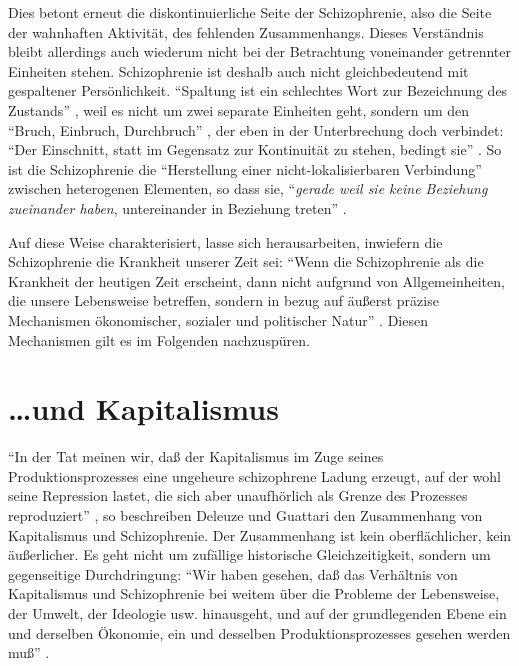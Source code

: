 \documentclass[12pt,
               paper=a4,
               twoside=false,
               onehalfspacing,
               bibliography=totoc,
               toc=graduated,
               ]{scrartcl}
\newcommand{\pc}[2]{\parencite[#1]{#2}}
\begin{document}
Dies betont erneut die diskontinuierliche Seite der Schizophrenie,
also die Seite der wahnhaften Aktivität, des fehlenden Zusammenhangs.
Dieses Verständnis bleibt allerdings auch wiederum nicht bei der
Betrachtung voneinander getrennter Einheiten stehen. Schizophrenie ist
deshalb auch nicht gleichbedeutend mit gespaltener Persönlichkeit.
"`Spaltung ist ein schlechtes Wort zur Bezeichnung des Zustands"'
\pc{27}{schizg}, weil es nicht um zwei separate Einheiten geht,
sondern um den "`Bruch, Einbruch, Durchbruch"' \pc{28}{schizg}, der
eben in der Unterbrechung doch verbindet: "`Der Einschnitt, statt im
Gegensatz zur Kontinuität zu stehen, bedingt sie"' \pc{47}{ao}. So ist
die Schizophrenie die "`Herstellung einer nicht-lokalisierbaren
Verbindung"' \pc{19}{schizg} zwischen heterogenen Elementen, so dass
sie, "`\emph{gerade weil sie keine Beziehung zueinander haben},
untereinander in Beziehung treten"' \pc{S. 19, Hervorh. im
Orig.}{schizg}.

Auf diese Weise charakterisiert, lasse sich herausarbeiten, inwiefern
die Schizophrenie die Krankheit unserer Zeit sei: "`Wenn die
Schizophrenie als die Krankheit der heutigen Zeit erscheint, dann
nicht aufgrund von Allgemeinheiten, die unsere Lebensweise betreffen,
sondern in bezug auf äußerst präzise Mechanismen ökonomischer,
sozialer und politischer Natur"' \pc{28}{schizg}. Diesen Mechanismen
gilt es im Folgenden nachzuspüren.



\section{\dots und Kapitalismus}

"`In der Tat meinen wir, daß der Kapitalismus im Zuge seines
Produktionsprozesses eine ungeheure schizophrene Ladung erzeugt, auf
der wohl seine Repression lastet, die sich aber unaufhörlich als
Grenze des Prozesses reproduziert"' \pc{45}{ao}, so beschreiben
Deleuze und Guattari den Zusammenhang von Kapitalismus und
Schizophrenie. Der Zusammenhang ist kein oberflächlicher, kein
äußerlicher. Es geht nicht um zufällige historische Gleichzeitigkeit,
sondern um gegenseitige Durchdringung: "`Wir haben gesehen, daß das
Verhältnis von Kapitalismus und Schizophrenie bei weitem über die
Probleme der Lebensweise, der Umwelt, der Ideologie usw. hinausgeht,
und auf der grundlegenden Ebene ein und derselben Ökonomie, ein und
desselben Produktionsprozesses gesehen werden muß"' \pc{315}{ao}.
\end{document}
